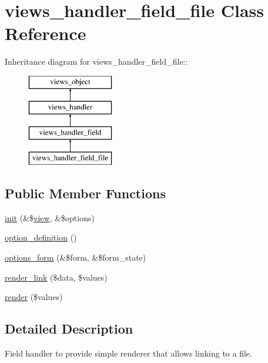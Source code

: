 \hypertarget{classviews__handler__field__file}{
\section{views\_\-handler\_\-field\_\-file Class Reference}
\label{classviews__handler__field__file}
}
Inheritance diagram for views\_\-handler\_\-field\_\-file::\begin{figure}[H]
\begin{center}
\leavevmode
\includegraphics[height=4cm]{classviews__handler__field__file}
\end{center}
\end{figure}
\subsection*{Public Member Functions}
\begin{CompactItemize}
\item 
\hyperlink{classviews__handler__field__file_a0c76118aaf12d0938111d093411c016}{init} (\&\$\hyperlink{classview}{view}, \&\$options)
\item 
\hyperlink{classviews__handler__field__file_0bf24a6e9139daa5206f209b39aea824}{option\_\-definition} ()
\item 
\hyperlink{classviews__handler__field__file_ab95242357e45be9c4fbbced1f625d7b}{options\_\-form} (\&\$form, \&\$form\_\-state)
\item 
\hyperlink{classviews__handler__field__file_01e20dce2e91288a77521c1564754d03}{render\_\-link} (\$data, \$values)
\item 
\hyperlink{classviews__handler__field__file_624c3ed9f9f4b194e2a9a0b7d6acb384}{render} (\$values)
\end{CompactItemize}


\subsection{Detailed Description}
Field handler to provide simple renderer that allows linking to a file. 

